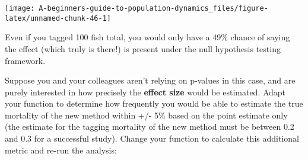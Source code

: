 \documentclass[]{book}
\begin{document}
\begin{center}\texttt{[image: A-beginners-guide-to-population-dynamics\_files/figure-latex/unnamed-chunk-46-1]} \end{center}

Even if you tagged 100 fish total, you would only have a 49\% chance of saying the effect (which truly is there!) is present under the null hypothesis testing framework.

Suppose you and your colleagues aren't relying on p-values in this case, and are purely interested in how precisely the \textbf{effect size} would be estimated. Adapt your function to determine how frequently you would be able to estimate the true mortality of the new method within +/- 5\% based on the point estimate only (the estimate for the tagging mortality of the new method must be between 0.2 and 0.3 for a successful study). Change your function to calculate this additional metric and re-run the analysis:
\end{document}
